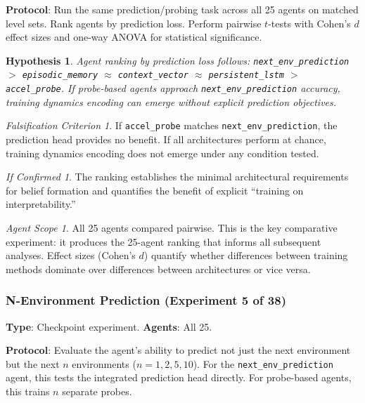 \documentclass[11pt,a4paper]{article}
\newtheorem{hypothesis}{Hypothesis}[subsection]
\theoremstyle{remark}
\newtheorem*{falsification}{Falsification Criterion}
\newtheorem*{implication}{If Confirmed}
\newtheorem*{agentscope}{Agent Scope}
\begin{document}
\textbf{Protocol}: Run the same prediction/probing task across all 25 agents on matched level sets. Rank agents by prediction loss. Perform pairwise $t$-tests with Cohen's $d$ effect sizes and one-way ANOVA for statistical significance.

\begin{hypothesis}
Agent ranking by prediction loss follows: \texttt{next\_env\_prediction} $>$ \texttt{episodic\_memory} $\approx$ \texttt{context\_vector} $\approx$ \texttt{persistent\_lstm} $>$ \texttt{accel\_probe}. If probe-based agents approach \texttt{next\_env\_prediction} accuracy, training dynamics encoding can emerge without explicit prediction objectives.
\end{hypothesis}

\begin{falsification}
If \texttt{accel\_probe} matches \texttt{next\_env\_prediction}, the prediction head provides no benefit. If all architectures perform at chance, training dynamics encoding does not emerge under any condition tested.
\end{falsification}

\begin{implication}
The ranking establishes the minimal architectural requirements for belief formation and quantifies the benefit of explicit ``training on interpretability.''
\end{implication}

\begin{agentscope}
All 25 agents compared pairwise. This is the key comparative experiment: it produces the 25-agent ranking that informs all subsequent analyses. Effect sizes (Cohen's $d$) quantify whether differences between training methods dominate over differences between architectures or vice versa.
\end{agentscope}

\subsubsection{N-Environment Prediction (Experiment 5 of 38)}
\label{exp:n_env_prediction}

\textbf{Type}: Checkpoint experiment. \textbf{Agents}: All 25.

\textbf{Protocol}: Evaluate the agent's ability to predict not just the next environment but the next $n$ environments ($n = 1, 2, 5, 10$). For the \texttt{next\_env\_prediction} agent, this tests the integrated prediction head directly. For probe-based agents, this trains $n$ separate probes.
\end{document}
